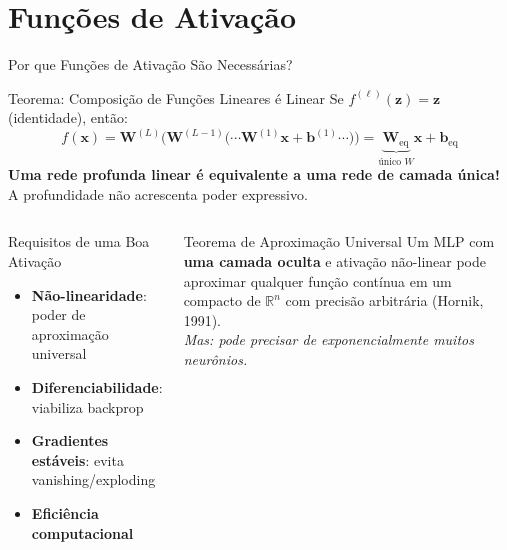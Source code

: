 \documentclass[7pt, aspectratio=169,10pt]{beamer}
\newcommand{\bx}{\bm{x}}
\newcommand{\bW}{\bm{W}}
\newcommand{\bb}{\bm{b}}
\newcommand{\bz}{\bm{z}}
\newcommand{\R}{\mathbb{R}}
\begin{document}
\section{Funções de Ativação}

\begin{frame}{Por que Funções de Ativação São Necessárias?}
\begin{alertblock}{Teorema: Composição de Funções Lineares é Linear}
\small
Se $f^{(\ell)}(\bz) = \bz$ (identidade), então:
\[
f(\bx) = \bW^{(L)}\!\bigl(\bW^{(L-1)}\!\bigl(\cdots\bW^{(1)}\bx+\bb^{(1)}\cdots\bigr)\bigr)
= \underbrace{\bW_{\text{eq}}}_{\text{único }W}\bx + \bb_{\text{eq}}
\]
\textbf{Uma rede profunda linear é equivalente a uma rede de camada única!}
A profundidade não acrescenta poder expressivo.
\end{alertblock}
\vspace{6pt}
\begin{columns}[T]
\begin{block}{Requisitos de uma Boa Ativação}
\small
\begin{itemize}
  \item \textbf{Não-linearidade}: poder de aproximação universal
  \item \textbf{Diferenciabilidade}: viabiliza backprop
  \item \textbf{Gradientes estáveis}: evita vanishing/exploding
  \item \textbf{Eficiência computacional}
\end{itemize}
\end{block}
\begin{block}{Teorema de Aproximação Universal}
\small
Um MLP com \textbf{uma camada oculta} e ativação não-linear pode aproximar qualquer função contínua em um compacto de $\R^n$ com precisão arbitrária (Hornik, 1991).
\\\textit{Mas: pode precisar de exponencialmente muitos neurônios.}
\end{block}
\end{columns}
\end{frame}
\end{document}

